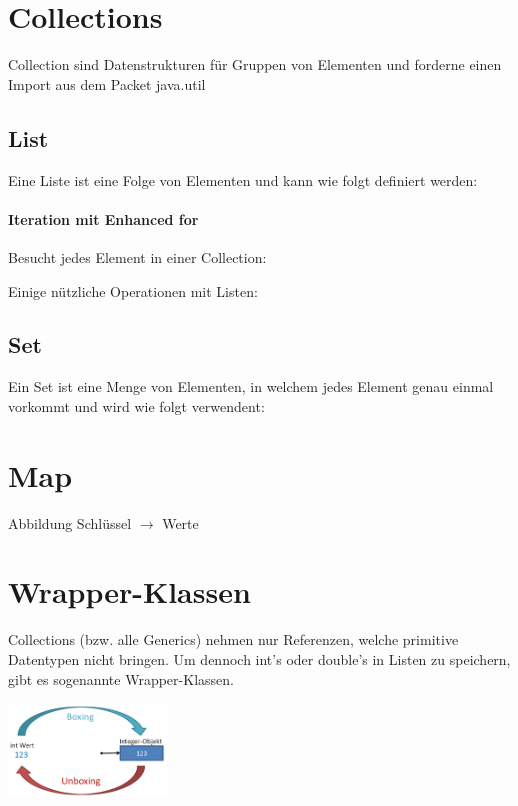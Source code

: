 \section*{Collections}
	Collection sind Datenstrukturen für Gruppen von Elementen und forderne einen Import aus dem Packet java.util
	\subsection*{List}
	\begin{minipage}[t]{11cm}
			Eine Liste ist eine Folge von Elementen und kann wie folgt definiert werden:
			
	\end{minipage}
	\hspace*{0.5cm}
	\begin{minipage}[t]{7.3cm}
		\vspace*{-0.18cm}
		\paragraph*{Iteration mit Enhanced for}
			Besucht jedes Element in einer Collection:
			
	\end{minipage}
	Einige nützliche Operationen mit Listen:
	
	\subsection*{Set}
		Ein Set ist eine Menge von Elementen, in welchem jedes Element genau einmal vorkommt und wird wie folgt verwendent:
		
		
\section*{Map}
		Abbildung Schlüssel $\rightarrow$ Werte
		
		
\section*{Wrapper-Klassen}
	Collections (bzw. alle Generics) nehmen nur Referenzen, welche primitive Datentypen nicht bringen. Um dennoch int's oder double's in Listen zu speichern, gibt es sogenannte Wrapper-Klassen.\\
	\begin{minipage}[t]{10cm}
		
	\end{minipage}
	\hspace*{0.5cm}
	\begin{minipage}[b]{7.3cm}
		\includegraphics[height=2.5cm, align=t]{pics/boxing_unboxing.PNG}
	\end{minipage}